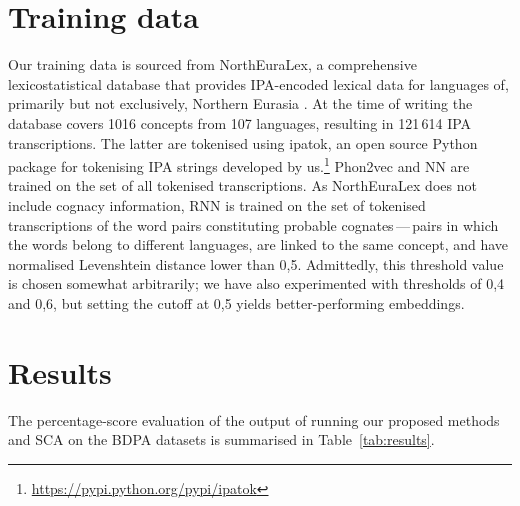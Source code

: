 \documentclass[a4paper]{report}
\begin{document}
\section{Training data}

Our training data is sourced from NorthEuraLex, a comprehensive lexicostatistical database
that provides IPA-encoded lexical data for languages of, primarily but not exclusively, Northern Eurasia \citep{2017_Dellert_Jäger}.
At the time of writing the database covers 1016 concepts from 107 languages, resulting in 121\,614 IPA transcriptions.
The latter are tokenised using ipatok, an open source Python package for tokenising IPA strings developed by us.\footnote{\url{https://pypi.python.org/pypi/ipatok}}
Phon2vec and NN are trained on the set of all tokenised transcriptions.
As NorthEuraLex does not include cognacy information, RNN is trained on the set of tokenised transcriptions of the word pairs constituting probable cognates\,---\,pairs
in which the words belong to different languages, are linked to the same concept, and have normalised Levenshtein distance lower than 0,5.
Admittedly, this threshold value is chosen somewhat arbitrarily;
we have also experimented with thresholds of 0,4 and 0,6, but setting the cutoff at 0,5 yields better-performing embeddings.


\section{Results}

The percentage-score evaluation of the output of running our proposed methods and SCA on the BDPA datasets is summarised in Table~\ref{tab:results}.
\end{document}
